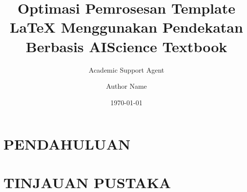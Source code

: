 \documentclass{book}
\title{Optimasi Pemrosesan Template LaTeX Menggunakan Pendekatan Berbasis AI}
\author{Academic Support Agent}
\date{\today}
\begin{document}
\maketitle

\begin{abstract}

\end{abstract}

\chapter{PENDAHULUAN}


\chapter{TINJAUAN PUSTAKA}



\title{Science Textbook}
\newcommand{\booksubtitle}{A Latex Template for a Science Textbook}
\newcommand{\booklicense}{Creative Commons Zero 1.0 Universal}

\author{Author Name}
\newcommand{\authorsubtitle}{City, Country}

\makeatletter
\newcommand{\booktitle}{\@title}
\newcommand{\bookauthor}{\@author}
\makeatother

\usepackage[utf8]{inputenc}  
\usepackage{fix-cm}  %
\usepackage{tikz}    %
\usepackage{amsmath} %

%
\usepackage[bindingoffset=0.625in,
            left=.5in, right=.5in,
            top=.8125in, bottom=.9375in,
            paperwidth=6.375in, paperheight=9.25in]{geometry}
\end{document}
